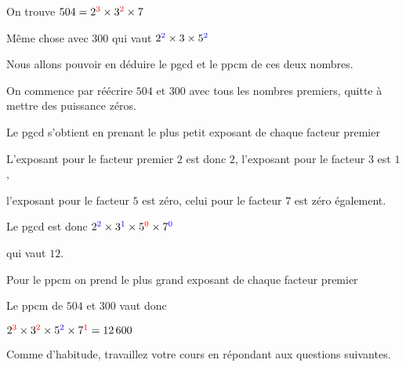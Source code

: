 On trouve 
$504 = 2^{\color{red}{3}} \times 3^{\color{red}{2}} \times 7$

\change

Même chose avec $300$ qui vaut $2^{\color{blue}{2}} \times 3 \times 5^{\color{blue}{2}}$


Nous allons pouvoir en déduire le pgcd et le ppcm de ces deux nombres.

\change

On commence par réécrire $504$ et $300$ avec tous les nombres premiers, quitte
à mettre des puissance zéros.


\change

Le pgcd s'obtient en prenant le plus petit exposant de chaque facteur premier

\change

L'exposant pour le facteur premier $2$ est donc $2$, l'exposant pour le facteur $3$ est $1$,

l'exposant pour le facteur $5$  est zéro, celui pour le facteur $7$ est zéro également.

Le pgcd est donc $2^{\color{blue}{2}} \times 3^{\color{blue}{1}} \times 
5^{\color{red}{0}} \times 7^{\color{blue}{0}}$ 

\change

qui vaut $12$.

\change 

Pour le ppcm on prend le plus grand exposant de chaque facteur premier

\change

Le ppcm de $504$ et $300$ vaut donc 

$2^{\color{red}{3}} \times 3^{\color{red}{2}} 
\times 5^{\color{blue}{2}} \times 7^{\color{red}{1}} = 12\,600$


\diapo


Comme d'habitude, travaillez votre cours en répondant aux questions suivantes.


